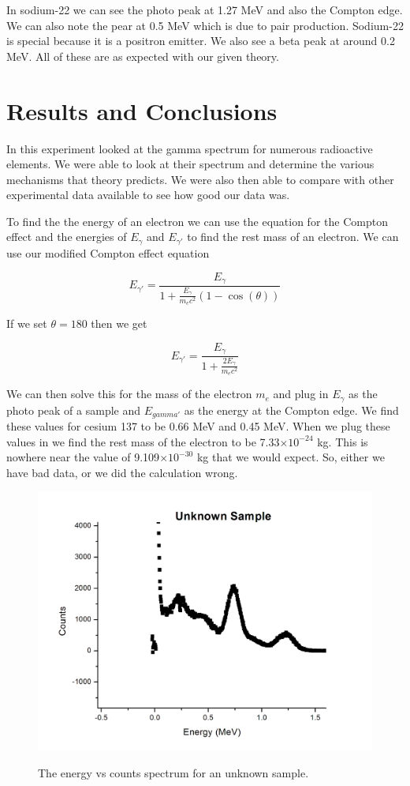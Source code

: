 \documentclass[12pt letterpaper]{article}
\providecommand{\e}[1]{\ensuremath{\times 10^{#1}}}
\begin{document}
In sodium-22 we can see the photo peak at 1.27 MeV and also the Compton edge. We can also note the pear at 0.5 MeV which is due to pair production. Sodium-22 is special because it is a positron emitter. We also see a beta peak at around 0.2 MeV. All of these are as expected with our given theory. 



\section*{Results and Conclusions}

In this experiment looked at the gamma spectrum for numerous radioactive elements. We were able to look at their spectrum and determine the various mechanisms that theory predicts. We were also then able to compare with other experimental data available to see how good our data was. 

To find the the energy of an electron we can use the equation for the Compton effect and the energies of $E_{\gamma}$ and $E_{\gamma'}$ to find the rest mass of an electron. We can use our modified Compton effect equation 

\begin{equation}
E_{\gamma'} = \frac{E_{\gamma}}{1 + \frac{E_{\gamma}}{m_e c^2}(1 - \cos(\theta))}
\end{equation}

If we set $\theta = 180$ then we get 

\begin{equation}
E_{\gamma'} = \frac{E_{\gamma}}{1 + \frac{2E_{\gamma}}{m_e c^2}}
\end{equation}

We can then solve this for the mass of the electron $m_e$ and plug in $E_{\gamma}$ as the photo peak of a sample and $E_{gamma'}$ as the energy at the Compton edge. We find these values for cesium 137 to be 0.66 MeV and 0.45 MeV. When we plug these values in we find the rest mass of the electron to be 7.33\e{-24} kg. This is nowhere near the value of 9.109\e{-30} kg that we would expect. So, either we have bad data, or we did the calculation wrong. 


\begin{figure}[H]
  \caption{The energy vs counts spectrum for an unknown sample.}
  \centering
    \includegraphics[width=.60\textwidth]{unknown_sample.JPG}
    \label{fig:unknown_sample}
\end{figure}
\end{document}
